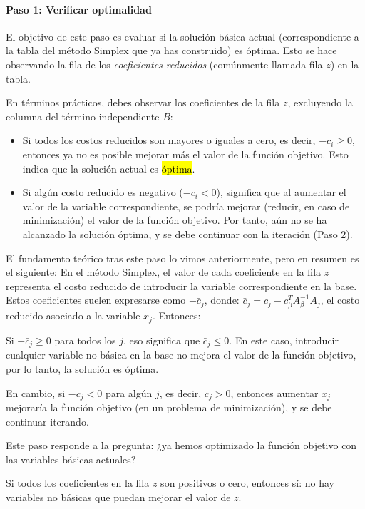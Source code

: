 \paragraph{Paso 1: Verificar optimalidad}

El objetivo de este paso es evaluar si la solución básica actual (correspondiente a la tabla del método Simplex que ya has construido) es óptima. Esto se hace observando la fila de los \textit{coeficientes reducidos} (comúnmente llamada fila \(z\)) en la tabla.

En términos prácticos, debes observar los coeficientes de la fila \(z\), excluyendo la columna del término independiente \(B\):
\begin{itemize}
  \item Si todos los costos reducidos son mayores o iguales a cero, es decir, \(-c_i \geq 0\), entonces ya no es posible mejorar más el valor de la función objetivo. Esto indica que la solución actual es \hl{óptima}.
  \item Si algún costo reducido es negativo (\(-\bar{c}_i<0\)), significa que al aumentar el valor de la variable correspondiente, se podría mejorar (reducir, en caso de minimización) el valor de la función objetivo. Por tanto, aún no se ha alcanzado la solución óptima, y se debe continuar con la iteración (Paso 2).
\end{itemize}

El fundamento teórico tras este paso lo vimos anteriormente, pero en resumen es el siguiente: En el método Simplex, el valor de cada coeficiente en la fila \(z\) representa el costo reducido de introducir la variable correspondiente en la base. Estos coeficientes suelen expresarse como \(-\bar{c}_j\), donde: \(\bar{c}_j = c_j - c_\beta^T A_\beta^{-1} A_j\), el costo reducido asociado a la variable \(x_j\).
Entonces:

Si \(-\bar{c}_j \geq 0\) para todos los \(j\), eso significa que \(\bar{c}_j \leq 0\). En este caso, introducir cualquier variable no básica en la base no mejora el valor de la función objetivo, por lo tanto, la solución es óptima.

En cambio, si \(-\bar{c}_j < 0\) para algún \(j\), es decir, \(\bar{c}_j > 0\), entonces aumentar \(x_j\) mejoraría la función objetivo (en un problema de minimización), y se debe continuar iterando.

Este paso responde a la pregunta: ¿ya hemos optimizado la función objetivo con las variables básicas actuales?

Si todos los coeficientes en la fila \(z\) son positivos o cero, entonces sí: no hay variables no básicas que puedan mejorar el valor de \(z\).

